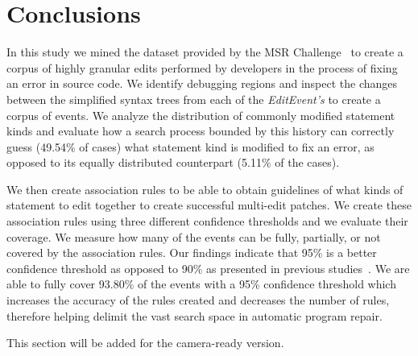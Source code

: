 \documentclass[sigconf]{acmart}
\begin{document}
\section{Conclusions}
\label{conclusions}
In this study we mined the dataset provided by the MSR Challenge~\cite{msr18challenge}
to create a corpus of highly granular edits performed by developers in the process
of fixing an error in source code. We identify debugging
regions and inspect the changes between the simplified 
syntax trees from each
of the \textit{EditEvent's} to create a corpus of 
events.
We analyze the distribution of commonly modified statement kinds and evaluate
how a search process bounded by this history can correctly guess (49.54\% of 
cases) what statement kind is modified to fix an error, as opposed to its
equally distributed counterpart (5.11\% of the cases).

We then create association rules to be able to obtain guidelines of what kinds of
statement to edit together to create successful multi-edit patches. 
We create these association rules using three different confidence thresholds and
we evaluate their coverage.
We measure how many of the events
can be fully, partially, or not covered by the association rules.
Our findings indicate that 95\% is a better confidence threshold as 
opposed to 90\% as presented in previous studies~\cite{Soto18}. 
We are able to fully cover 93.80\% of the events with a 95\% confidence threshold
which increases the accuracy of the rules created and decreases the 
number of rules, therefore helping delimit the vast search space 
in automatic program repair.




\begin{acks}
 This section will be added for the camera-ready version.

\end{acks}




\end{document}
